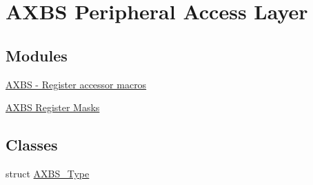 \hypertarget{group__AXBS__Peripheral__Access__Layer}{}\section{A\+X\+BS Peripheral Access Layer}
\label{group__AXBS__Peripheral__Access__Layer}
\subsection*{Modules}
\begin{DoxyCompactItemize}
\item 
\hyperlink{group__AXBS__Register__Accessor__Macros}{A\+X\+B\+S -\/ Register accessor macros}
\item 
\hyperlink{group__AXBS__Register__Masks}{A\+X\+B\+S Register Masks}
\end{DoxyCompactItemize}
\subsection*{Classes}
\begin{DoxyCompactItemize}
\item 
struct \hyperlink{structAXBS__Type}{A\+X\+B\+S\+\_\+\+Type}
\end{DoxyCompactItemize}
